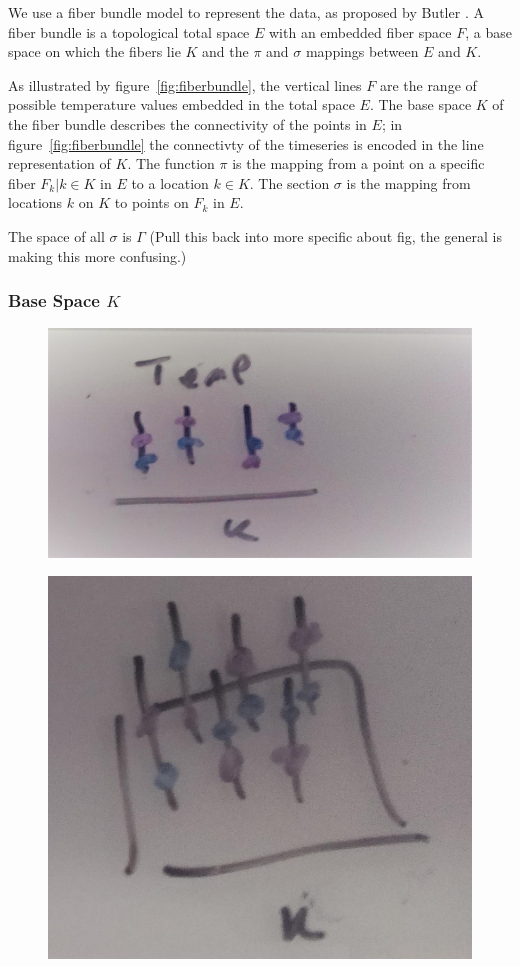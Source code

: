 \documentclass[../main.tex]{subfiles}
\begin{document}
We use a fiber bundle model to represent the data, as proposed by Butler 
\cite{butlerVectorBundleClassesForm1992,butlerVisualizationModelBased1989}. A fiber bundle is a topological total space $E$ with an embedded fiber space $F$, a base space on which the fibers lie $K$ and the $\pi$ and $\sigma$ mappings between $E$ and $K$. 


As illustrated by figure~\ref{fig:fiberbundle}, the vertical lines $F$ are the range of possible temperature values embedded in the total space $E$. The base space $K$ of the fiber bundle describes the connectivity of the points in $E$; in figure~\ref{fig:fiberbundle} the connectivty of the timeseries is encoded in the line representation of $K$. The function $\pi$ is the mapping from a point on a specific fiber $F_{k}|k\in K$ in $E$ to a location $k \in K$. 
The section $\sigma$ is the mapping from locations $k$ on $K$ to points on $F_{k}$ in $E$.

The space of all $\sigma$ is $\Gamma$  (Pull this back into more specific about fig, the general is making this more confusing.)

\subsubsection{Base Space $K$}
\begin{figure}[ht]
    \includegraphics[width=0.2\linewidth]{figures/sections/math/temp_1k.png}
\end{figure}
\begin{figure}[ht]
    \includegraphics[width=0.2\linewidth]{figures/sections/math/temp_2k.png}
\end{figure}
\end{document}
